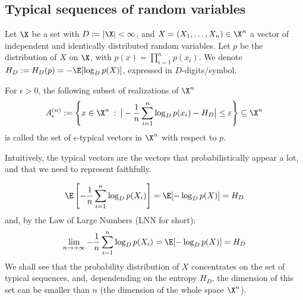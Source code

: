 \documentclass[toc]{../cs-classes/cs-classes}
\begin{document}
\subsection{Typical sequences of random variables}
\begin{definition}
    Let $\X$ be a set with $D:=|\X|<\infty$, and $X=(X_1, \dots, X_n)\in \X^n$ a vector of independent and identically distributed random variables. Let $p$ be the distribution of $X$ on $\X$, with $p(x)=\prod_{i=1}^n p(x_i)$. We denote $H_D:=H_D(p)=-\E[\log_Dp(X)]$, expressed in $D$-digits/symbol.

    For $\epsilon>0$, the following subset of realizations of $\X^n$
    \begin{equation}
        A_\epsilon^{(n)}:=\left\{x\in \X^n \: : \: \big| -\frac{1}{n}\sum_{i=1}^n \log_Dp(x_i)-H_D\big|\leq \varepsilon\right\}\subseteq \X^n
    \end{equation}
    is called the set of $\epsilon$-typical vectors in $\X^n$ with respect to $p$.

    Intuitively, the typical vectors are the vectors that probabilistically appear a lot, and that we need to represent faithfully.
\end{definition}

\begin{remark}
    \begin{equation*}
        \E\left[-\frac{1}{n}\sum_{i=1}^n \log_Dp(X_i)\right] = \E[-\log_Dp(X)]=H_D
    \end{equation*}
    and, by the Law of Large Numbers (LNN for short):
    \begin{equation*}
        \lim_{n\to+\infty}-\frac{1}{n}\sum_{i=1}^n \log_Dp(X_i) = \E[-\log_D p(X)] = H_D
    \end{equation*}
    We shall see that the probability distribution of $X$ concentrates on the set of typical sequences, and, dependending on the entropy $H_D$, the dimension of this set can be smaller than $n$ (the dimension of the whole space $\X^n$).
\end{remark}
\end{document}
